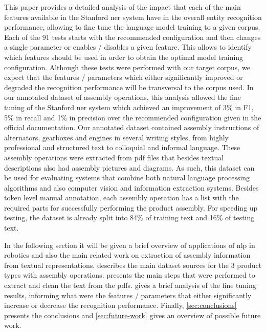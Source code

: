 This paper provides a detailed analysis of the impact that each of the main features available in the Stanford \gls{ner} system have in the overall entity recognition performance, allowing to fine tune the language model training to a given corpus. Each of the 91 tests starts with the recommended configuration and then changes a single parameter or enables / disables a given feature. This allows to identify which features should be used in order to obtain the optimal model training configuration. Although these tests were performed with our target corpus, we expect that the features / parameters which either significantly improved or degraded the recognition performance will be transversal to the corpus used. In our annotated dataset of assembly operations, this analysis allowed the fine tuning of the Stanford \gls{ner} system which achieved an improvement of 3\% in F1, 5\% in recall and 1\% in precision over the recommended configuration given in the official documentation. Our annotated dataset contained assembly instructions of alternators, gearboxes and engines in several writing styles, from highly professional and structured text to colloquial and informal language. These assembly operations were extracted from \gls{pdf} files that besides textual descriptions also had assembly pictures and diagrams. As such, this dataset can be used for evaluating systems that combine both natural language processing algorithms and also computer vision and information extraction systems. Besides token level manual annotation, each assembly operation has a list with the required parts for successfully performing the product assembly. For speeding up testing, the dataset is already split into 84\% of training text and 16\% of testing text.

In the following section it will be given a brief overview of applications of \gls{nlp} in robotics and also the main related work on extraction of assembly information from textual representations.  describes the main dataset sources for the 3 product types with assembly operations.  presents the main steps that were performed to extract and clean the text from the \glspl{pdf}.  gives a brief analysis of the fine tuning results, informing what were the features / parameters that either significantly increase or decrease the recognition performance. Finally, \cref{sec:conclusions} presents the conclusions and \cref{sec:future-work} gives an overview of possible future work.
